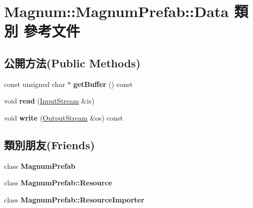 \hypertarget{class_magnum_1_1_magnum_prefab_1_1_data}{}\section{Magnum\+:\+:Magnum\+Prefab\+:\+:Data 類別 參考文件}
\label{class_magnum_1_1_magnum_prefab_1_1_data}
\subsection*{公開方法(Public Methods)}
\begin{DoxyCompactItemize}
\item 
const unsigned char $\ast$ {\bfseries get\+Buffer} () const \hypertarget{class_magnum_1_1_magnum_prefab_1_1_data_acf7fd1226b56774989bb6a5227bd7fce}{}\label{class_magnum_1_1_magnum_prefab_1_1_data_acf7fd1226b56774989bb6a5227bd7fce}

\item 
void {\bfseries read} (\hyperlink{class_magnum_1_1_input_stream}{Input\+Stream} \&is)\hypertarget{class_magnum_1_1_magnum_prefab_1_1_data_aad174072e5a3c31544b1cc58b555ba1b}{}\label{class_magnum_1_1_magnum_prefab_1_1_data_aad174072e5a3c31544b1cc58b555ba1b}

\item 
void {\bfseries write} (\hyperlink{class_magnum_1_1_output_stream}{Output\+Stream} \&os) const \hypertarget{class_magnum_1_1_magnum_prefab_1_1_data_a2de71c850e6a24bd8e0e7c2e1c6876a7}{}\label{class_magnum_1_1_magnum_prefab_1_1_data_a2de71c850e6a24bd8e0e7c2e1c6876a7}

\end{DoxyCompactItemize}
\subsection*{類別朋友(Friends)}
\begin{DoxyCompactItemize}
\item 
class {\bfseries Magnum\+Prefab}\hypertarget{class_magnum_1_1_magnum_prefab_1_1_data_af673f35827b6a2ca5306beed6f132f97}{}\label{class_magnum_1_1_magnum_prefab_1_1_data_af673f35827b6a2ca5306beed6f132f97}

\item 
class {\bfseries Magnum\+Prefab\+::\+Resource}\hypertarget{class_magnum_1_1_magnum_prefab_1_1_data_a96406f0ce756fc948a514e9f70ce0305}{}\label{class_magnum_1_1_magnum_prefab_1_1_data_a96406f0ce756fc948a514e9f70ce0305}

\item 
class {\bfseries Magnum\+Prefab\+::\+Resource\+Importer}\hypertarget{class_magnum_1_1_magnum_prefab_1_1_data_a4eb47515c2ca88e47be1dcbb51810ba6}{}\label{class_magnum_1_1_magnum_prefab_1_1_data_a4eb47515c2ca88e47be1dcbb51810ba6}

\end{DoxyCompactItemize}


